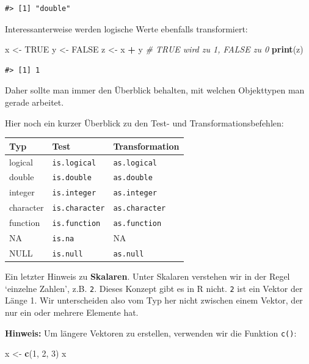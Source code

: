 \documentclass[]{book}
\newenvironment{Shaded}{\begin{snugshade}}{\end{snugshade}}
\newcommand{\KeywordTok}[1]{\textcolor[rgb]{0.13,0.29,0.53}{\textbf{#1}}}
\newcommand{\DecValTok}[1]{\textcolor[rgb]{0.00,0.00,0.81}{#1}}
\newcommand{\StringTok}[1]{\textcolor[rgb]{0.31,0.60,0.02}{#1}}
\newcommand{\CommentTok}[1]{\textcolor[rgb]{0.56,0.35,0.01}{\textit{#1}}}
\newcommand{\OtherTok}[1]{\textcolor[rgb]{0.56,0.35,0.01}{#1}}
\newcommand{\OperatorTok}[1]{\textcolor[rgb]{0.81,0.36,0.00}{\textbf{#1}}}
\newcommand{\NormalTok}[1]{#1}
\begin{document}
\begin{verbatim}
#> [1] "double"
\end{verbatim}

Interessanterweise werden logische Werte ebenfalls transformiert:

\begin{Shaded}
\begin{Highlighting}[]
\NormalTok{x <-}\StringTok{ }\OtherTok{TRUE}
\NormalTok{y <-}\StringTok{ }\OtherTok{FALSE}
\NormalTok{z <-}\StringTok{ }\NormalTok{x }\OperatorTok{+}\StringTok{ }\NormalTok{y }\CommentTok{# TRUE wird zu 1, FALSE zu 0}
\KeywordTok{print}\NormalTok{(z) }
\end{Highlighting}
\end{Shaded}

\begin{verbatim}
#> [1] 1
\end{verbatim}

Daher sollte man immer den Überblick behalten, mit welchen Objekttypen
man gerade arbeitet.

Hier noch ein kurzer Überblick zu den Test- und Transformationsbefehlen:

\begin{longtable}[]{@{}lll@{}}
\toprule
Typ & Test & Transformation\tabularnewline
\midrule
\endhead
logical & \texttt{is.logical} & \texttt{as.logical}\tabularnewline
double & \texttt{is.double} & \texttt{as.double}\tabularnewline
integer & \texttt{is.integer} & \texttt{as.integer}\tabularnewline
character & \texttt{is.character} & \texttt{as.character}\tabularnewline
function & \texttt{is.function} & \texttt{as.function}\tabularnewline
NA & \texttt{is.na} & NA\tabularnewline
NULL & \texttt{is.null} & \texttt{as.null}\tabularnewline
\bottomrule
\end{longtable}

Ein letzter Hinweis zu \textbf{Skalaren}. Unter Skalaren verstehen wir
in der Regel `einzelne Zahlen', z.B. \texttt{2}. Dieses Konzept gibt es
in R nicht. \texttt{2} ist ein Vektor der Länge 1. Wir unterscheiden
also vom Typ her nicht zwischen einem Vektor, der nur ein oder mehrere
Elemente hat.

\textbf{Hinweis:} Um längere Vektoren zu erstellen, verwenden wir die
Funktion \texttt{c()}:

\begin{Shaded}
\begin{Highlighting}[]
\NormalTok{x <-}\StringTok{ }\KeywordTok{c}\NormalTok{(}\DecValTok{1}\NormalTok{, }\DecValTok{2}\NormalTok{, }\DecValTok{3}\NormalTok{)}
\NormalTok{x}
\end{Highlighting}
\end{Shaded}
\end{document}
